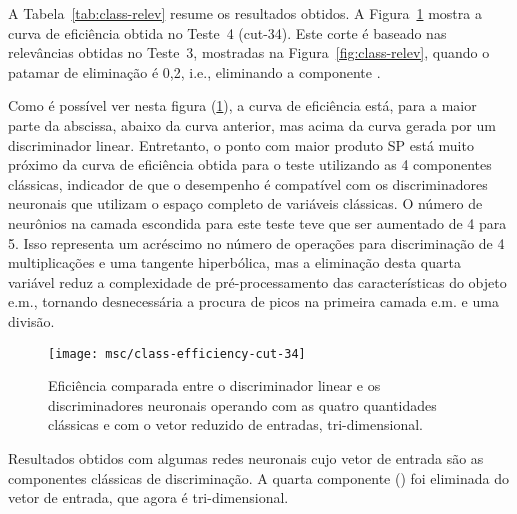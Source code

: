 A Tabela~\ref{tab:class-relev} resume os resultados obtidos. A
Figura~\ref{fig:class-relev-best} mostra a curva de eficiência obtida no
Teste~4 (cut-34). Este corte é baseado nas relevâncias obtidas no Teste~3,
mostradas na Figura~\ref{fig:class-relev}, quando o patamar de eliminação é
0,2, i.e., eliminando a componente \rstrip.

Como é possível ver nesta figura (\ref{fig:class-relev-best}), a curva de
eficiência está, para a maior parte da abscissa, abaixo da curva anterior, mas
acima da curva gerada por um discriminador linear. Entretanto, o ponto com
maior produto SP está muito próximo da curva de eficiência obtida para o teste
utilizando as 4 componentes clássicas, indicador de que o desempenho é
compatível com os discriminadores neuronais que utilizam o espaço completo de
variáveis clássicas. O número de neurônios na camada escondida para este teste
teve que ser aumentado de 4 para 5. Isso representa um acréscimo no número de
operações para discriminação de 4 multiplicações e uma tangente hiperbólica,
mas a eliminação desta quarta variável reduz a complexidade de
pré-processamento das características do objeto e.m., tornando desnecessária a
procura de picos na primeira camada e.m. e uma divisão.

\begin{figure}
\begin{center}
\texttt{[image: msc/class-efficiency-cut-34]}
\end{center}
\caption[Eficiência comparada entre o discriminador linear e os discriminadores
neuronais.]{Eficiência comparada entre o discriminador linear e os
discriminadores neuronais operando com as quatro quantidades clássicas e com o
vetor reduzido de entradas, tri-dimensional.}
\label{fig:class-relev-best}
\end{figure}

\renewcommand{\baselinestretch}{1}
\begin{table}
\caption[Resultados obtidos com algumas redes neuronais cujo vetor de entrada
são as componentes clássicas de discriminação.]{Resultados obtidos com algumas
redes neuronais cujo vetor de entrada são as componentes clássicas de
discriminação. A quarta componente (\rstrip) foi eliminada do vetor de entrada,
que agora é tri-dimensional.}
\label{tab:class-relev}
\renewcommand{\baselinestretch}{1.5}
\small
\begin{center}\begin{sideways}

\end{sideways}
\end{center}
\end{table}
\renewcommand{\baselinestretch}{1.5}
\normalsize

